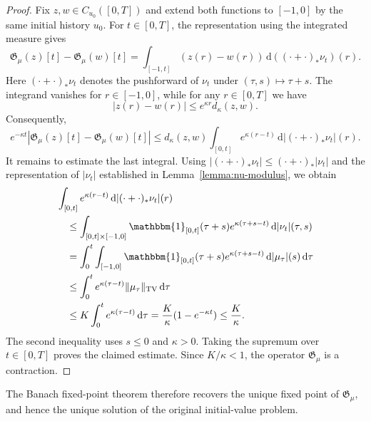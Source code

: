 \documentclass[reqno]{amsart}
\theoremstyle{plain}
\numberwithin{equation}{section}
\numberwithin{definition}{section}
\newcommand{\dd}{\ensuremath{\mathrm{d}}}
\begin{document}
\begin{proof}
Fix $z,w\in C_{u_0}([0,T])$ and extend both functions to
$[-1,0]$ by the same initial history $u_0$.
For $t\in[0,T]$, the representation using the integrated
measure gives
\begin{equation*}
\mathfrak{G}_\mu (z)[t]- \mathfrak{G}_\mu (w)[t]
=
\int_{[-1,t]}(z(r)-w(r))\,
\dd((\cdot+\cdot)_*\nu_t)(r).
\end{equation*}
Here $(\cdot+\cdot)_*\nu_t$ denotes the pushforward of
$\nu_t$ under $(\tau,s)\mapsto\tau+s$.
The integrand vanishes for $r\in[-1,0]$, while for any $r\in[0,T]$ we have 
\begin{equation*}
|z(r)-w(r)|
\le e^{\kappa r}d_\kappa(z,w). 
\end{equation*}
Consequently,
\begin{equation*}
e^{-\kappa t}
|\mathfrak{G}_\mu (z)[t]- \mathfrak{G}_\mu (w)[t]|
\le
d_\kappa(z,w)
\int_{[0,t]}e^{\kappa(r-t)}
\,\dd |(\cdot+\cdot)_*\nu_t|(r).
\end{equation*}
It remains to estimate the last integral. Using $|(\cdot+\cdot)_*\nu_t|
\le
(\cdot+\cdot)_*|\nu_t|$
and the representation of $|\nu_t|$ established in Lemma~\ref{lemma:nu-modulus}, we obtain
\begin{equation*}
\begin{aligned}
&\int_{[0,t]}e^{\kappa(r-t)}
\,\dd|(\cdot+\cdot)_*\nu_t|(r)
\\
&\quad\le
\int_{[0,t]\times[-1,0]}
\mathbbm{1}_{[0,t]}(\tau+s)e^{\kappa(\tau+s-t)}
\,\dd|\nu_t|(\tau,s)
\\
&\quad=
\int_0^t\int_{[-1,0]}
\mathbbm{1}_{[0,t]}(\tau+s)e^{\kappa(\tau+s-t)}
\,\dd|\mu_\tau|(s)\,\dd\tau
\\
&\quad\le
\int_0^t e^{\kappa(\tau-t)}
\|\mu_\tau\|_{\mathrm{TV}}\,\dd\tau
\\
&\quad\le
K\int_0^t e^{\kappa(\tau-t)}\,\dd\tau
=
\frac{K}{\kappa}(1-e^{-\kappa t})
\le \frac{K}{\kappa}.
\end{aligned}
\end{equation*}
The second inequality uses $s\le0$ and $\kappa>0$. Taking the supremum over $t\in[0,T]$ proves the claimed
estimate. Since $K/\kappa<1$, the operator
$\mathfrak{G}_\mu$ is a contraction.
\end{proof}

The Banach fixed-point theorem therefore recovers the unique
fixed point of $\mathfrak{G}_\mu$, and hence the unique solution
of the original initial-value problem.
\end{document}
